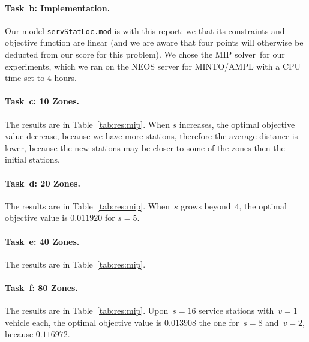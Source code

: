 \paragraph{Task~b: Implementation.}
Our model \texttt{servStatLoc.mod} is  with this
report: we  that its constraints and objective function
are linear (and we are aware that four points will otherwise be
deducted from our score for this problem).
%
We chose the MIP solver~\SolverMIP for our experiments, which we ran on the NEOS server for MINTO/AMPL with a CPU time set to 4 hours. 

\paragraph{Task~c: 10 Zones.}
The results are in Table~\ref{tab:res:mip}.
% 
When $s$ increases, the optimal objective value decrease, because we have more stations, therefore the average distance is lower, because the new stations may be closer to some of the zones then the initial stations. 

\paragraph{Task~d: 20 Zones.}
The results are in Table~\ref{tab:res:mip}.
%
When~$s$ grows beyond~$4$, the optimal objective value is $0.011920$ for $s=5$.

\paragraph{Task~e: 40 Zones.}
The results are in Table~\ref{tab:res:mip}.

\paragraph{Task~f: 80 Zones.}
The results are in Table~\ref{tab:res:mip}.
%
Upon~$s=16$ service stations with~$v=1$ vehicle each, the optimal
objective value is $0.013908$ the one for~$s=8$ and~$v=2$, because
$0.116972$.

